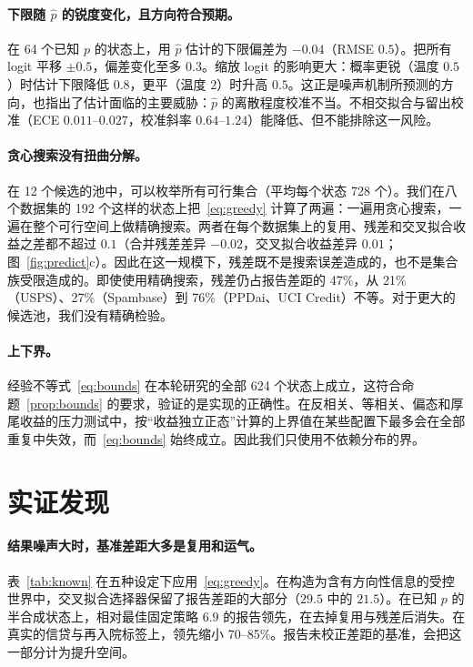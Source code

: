 \documentclass[runningheads]{llncs}
\begin{document}
\paragraph{下限随 $\hat p$ 的锐度变化，且方向符合预期。}在 64 个已知 $p$ 的状态上，用 $\hat p$ 估计的下限偏差为 $-0.04$（RMSE $0.5$）。把所有 logit 平移 $\pm0.5$，偏差变化至多 $0.3$。缩放 logit 的影响更大：概率更锐（温度 $0.5$）时估计下限降低 $0.8$，更平（温度 $2$）时升高 $0.5$。这正是噪声机制所预测的方向，也指出了估计面临的主要威胁：$\hat p$ 的离散程度校准不当。不相交拟合与留出校准（ECE $0.011$--$0.027$，校准斜率 $0.64$--$1.24$）能降低、但不能排除这一风险。

\paragraph{贪心搜索没有扭曲分解。}在 12 个候选的池中，可以枚举所有可行集合（平均每个状态 728 个）。我们在八个数据集的 192 个这样的状态上把~\eqref{eq:greedy} 计算了两遍：一遍用贪心搜索，一遍在整个可行空间上做精确搜索。两者在每个数据集上的复用、残差和交叉拟合收益之差都不超过 $0.1$（合并残差差异 $-0.02$，交叉拟合收益差异 $0.01$；图~\ref{fig:predict}c）。因此在这一规模下，残差既不是搜索误差造成的，也不是集合族受限造成的。即使使用精确搜索，残差仍占报告差距的 47\%，从 21\%（USPS）、27\%（Spambase）到 76\%（PPDai、UCI Credit）不等。对于更大的候选池，我们没有精确检验。

\paragraph{上下界。}经验不等式~\eqref{eq:bounds} 在本轮研究的全部 624 个状态上成立，这符合命题~\ref{prop:bounds} 的要求，验证的是实现的正确性。在反相关、等相关、偏态和厚尾收益的压力测试中，按“收益独立正态”计算的上界值在某些配置下最多会在全部重复中失效，而~\eqref{eq:bounds} 始终成立。因此我们只使用不依赖分布的界。

\section{实证发现}
\label{sec:findings}
\paragraph{结果噪声大时，基准差距大多是复用和运气。}表~\ref{tab:known} 在五种设定下应用~\eqref{eq:greedy}。在构造为含有方向性信息的受控世界中，交叉拟合选择器保留了报告差距的大部分（$29.5$ 中的 $21.5$）。在已知 $p$ 的半合成状态上，相对最佳固定策略 $6.9$ 的报告领先，在去掉复用与残差后消失。在真实的信贷与再入院标签上，领先缩小 70--85\%。报告未校正差距的基准，会把这一部分计为提升空间。
\end{document}
